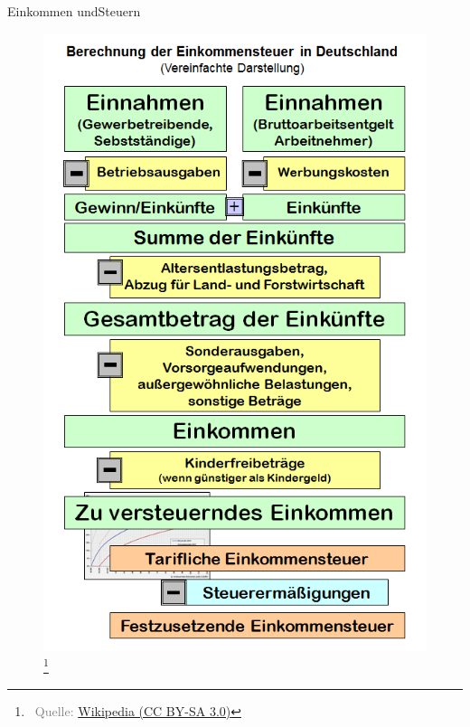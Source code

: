 \documentclass{beamer}
\let\oldfootnote\footnote
\renewcommand{\footnote}[1]
{%
	\oldfootnote
	{
		\tiny
		\textcolor{gray}{#1}
	}%
}
\newcommand{\citeurl}[2]
{%
	\footnote{\ Quelle: \href{#1}{#2}}
}
\begin{document}
			\begin{frame}{Einkommen und\newline Steuern}
				\begin{center}
					\begin{figure}
						\vspace{-1.5cm}
						\includegraphics[height=0.9\textheight]{images/zu-versteuerndes-einkommen.png}\citeurl{https://commons.wikimedia.org/wiki/File:Einnahmen_Einkuenfte_Einkommen_zvE.png}{Wikipedia (CC BY-SA 3.0)}
					\end{figure}
				\end{center}
			\end{frame}
			
\end{document}
